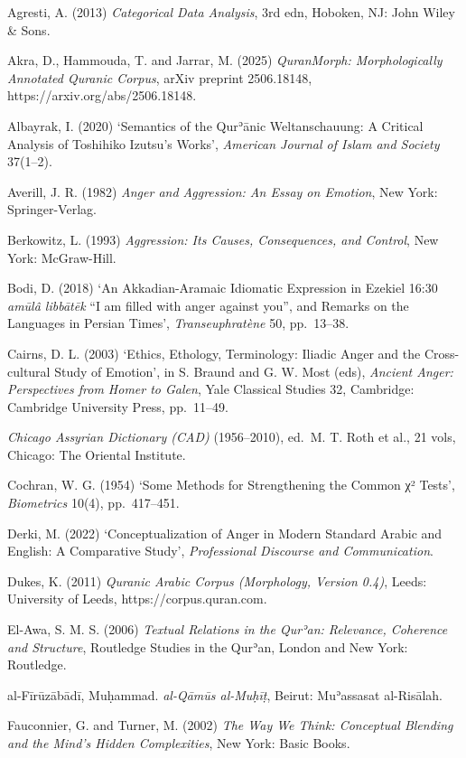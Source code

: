 Agresti, A. (2013) \emph{Categorical Data Analysis}, 3rd edn, Hoboken,
NJ: John Wiley \& Sons.

Akra, D., Hammouda, T. and Jarrar, M. (2025) \emph{QuranMorph:
Morphologically Annotated Quranic Corpus}, arXiv preprint 2506.18148,
https://arxiv.org/abs/2506.18148.

Albayrak, I. (2020) `Semantics of the Qurʾānic Weltanschauung: A
Critical Analysis of Toshihiko Izutsu's Works', \emph{American Journal
of Islam and Society} 37(1--2).

Averill, J. R. (1982) \emph{Anger and Aggression: An Essay on Emotion},
New York: Springer-Verlag.

Berkowitz, L. (1993) \emph{Aggression: Its Causes, Consequences, and
Control}, New York: McGraw-Hill.

Bodi, D. (2018) `An Akkadian-Aramaic Idiomatic Expression in Ezekiel
16:30 \emph{amūlâ libbātēk} ``I am filled with anger against you'', and
Remarks on the Languages in Persian Times', \emph{Transeuphratène} 50,
pp.~13--38.

Cairns, D. L. (2003) `Ethics, Ethology, Terminology: Iliadic Anger and
the Cross-cultural Study of Emotion', in S. Braund and G. W. Most (eds),
\emph{Ancient Anger: Perspectives from Homer to Galen}, Yale Classical
Studies 32, Cambridge: Cambridge University Press, pp.~11--49.

\emph{Chicago Assyrian Dictionary (CAD)} (1956--2010), ed.~M. T. Roth et
al., 21 vols, Chicago: The Oriental Institute.

Cochran, W. G. (1954) `Some Methods for Strengthening the Common χ²
Tests', \emph{Biometrics} 10(4), pp.~417--451.

Derki, M. (2022) `Conceptualization of Anger in Modern Standard Arabic
and English: A Comparative Study', \emph{Professional Discourse and
Communication}.

Dukes, K. (2011) \emph{Quranic Arabic Corpus (Morphology, Version 0.4)},
Leeds: University of Leeds, https://corpus.quran.com.

El-Awa, S. M. S. (2006) \emph{Textual Relations in the Qurʾan:
Relevance, Coherence and Structure}, Routledge Studies in the Qurʾan,
London and New York: Routledge.

al-Fīrūzābādī, Muḥammad. \emph{al-Qāmūs al-Muḥīṭ}, Beirut: Muʾassasat
al-Risālah.

Fauconnier, G. and Turner, M. (2002) \emph{The Way We Think: Conceptual
Blending and the Mind's Hidden Complexities}, New York: Basic Books.

